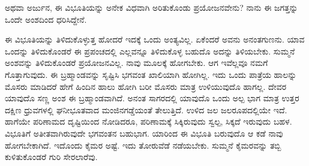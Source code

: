 \begin{artha}
ಅಥವಾ ಅರ್ಜುನ, ಈ ವಿಭೂತಿಯನ್ನು ಅನೇಕ ವಿಧವಾಗಿ ಅರಿತುಕೊಂಡು ಪ್ರಯೋಜನವೇನು? ನಾನು ಈ ಜಗತ್ತನ್ನು ಒಂದೇ ಅಂಶದಿಂದ ಧರಿಸಿದ್ದೇನೆ.
\end{artha}

ಈ ವಿಭೂತಿಯನ್ನು ತಿಳಿದುಕೊಳ್ಳುತ್ತ ಹೋದರೆ ಇದಕ್ಕೆ ಒಂದು ಅಂತ್ಯವಿಲ್ಲ. ಏಕೆಂದರೆ ಅವನು ಅನಂತಗುಣನು. ಯಾವ ಒಂದನ್ನು ತಿಳಿದುಕೊಂಡರೆ ಈ ಪ್ರಪಂಚದಲ್ಲಿ ಎಲ್ಲವನ್ನೂ ತಿಳಿದುಕೊಳ್ಳ ಬಹುದೊ ಅದನ್ನು ತಿಳಿಯಬೇಕು. ಸುಮ್ಮನೆ ಅಂಶವನ್ನು ತಿಳಿದುಕೊಂಡರೆ ಪ್ರಯೋಜನವಿಲ್ಲ. ನಾವು ಮೂಲಕ್ಕೆ ಹೋಗಬೇಕು. ಆಗ ಇವೆಲ್ಲವೂ ನಮಗೆ ಗೊತ್ತಾಗುವುದು. ಈ ಬ್ರಹ್ಮಾಂಡವನ್ನು ಸೃಷ್ಟಿಸಿ ಭಗವಂತ ಖಾಲಿಯಾಗಿ ಹೋಗಿಲ್ಲ. ಇದು ಒಂದು ಪಾತ್ರೆಯ ಹಾಲನ್ನು ಮೊಸರು ಮಾಡಿದರೆ ಹೇಗೆ ಹಿಂದಿನ ಹಾಲು ಹೋಗಿ ಬರೀ ಮೊಸರು ಮಾತ್ರ ಉಳಿಯುವುದೊ ಹಾಗಲ್ಲ. ದೇವರ ಯಾವುದೊ ಸಣ್ಣ ಅಂಶ ಈ ಬ್ರಹ್ಮಾಂಡವಾಗಿದೆ. ಅನಂತ ಸಾಗರದಲ್ಲಿ ಯಾವುದೊ ಒಂದು ಅಲ್ಪ ಭಾಗ ಮಾತ್ರ ಉತ್ತರ ದಕ್ಷಿಣ ಧ್ರುವಗಳಲ್ಲಿ ಘನೀಭೂತವಾದ ಮಂಜಿನಗಡ್ಡೆಯಂತೆ ತೇಲುತ್ತಿದೆ. ಉಳಿದ ಜಲ ಜಲರೂಪದಲ್ಲಿಯೇ ಇದೆ. ಹಾಗೆಯೇ ಪರಿಣಾಮದ ದೃಷ್ಟಿಯಿಂದ ನೋಡಿದರೂ, ಪರಿಣಾಮಕ್ಕೆ ಸಿಕ್ಕಿರುವುದು ಸ್ವಲ್ಪ, ಸಿಕ್ಕದೆ ಇರುವುದು ಬಹಳ. ವಿಭೂತಿಗೆ ಅತೀತವಾಗಿರುವುದೇ ಭಗವಂತನ ಬಹುಭಾಗ. ಯಾರಿಂದ ಈ ವಿಭೂತಿ ಬರುವುದೊ ಆ ಕಡೆ ನಾವು ಹೋಗಬೇಕಾಗಿದೆ. ಇದೊಂದು ಕೈಮರ ಅಷ್ಟೆ. ಇದು ತೋರುವೆಡೆ ನಡೆಯಬೇಕು. ಸುಮ್ಮನೆ ಕೈಮರವನ್ನು ತಬ್ಬಿ ಕುಳಿತುಕೊಂಡರೆ ಗುರಿ ಸೇರಲಾರೆವು.

